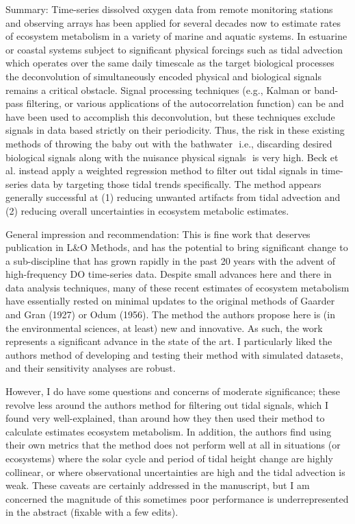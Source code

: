 \documentclass[letterpaper,12pt]{article}\usepackage[]{graphicx}\usepackage[]{color}
\begin{document}
Summary: Time-series dissolved oxygen data from remote monitoring stations and observing arrays has been applied for several decades now to estimate rates of ecosystem metabolism in a variety of marine and aquatic systems. In estuarine or coastal systems subject to significant physical forcings such as tidal advection  which operates over the same daily timescale as the target biological processes  the deconvolution of simultaneously encoded physical and biological signals remains a critical obstacle. Signal processing techniques (e.g., Kalman or
band-pass filtering, or various applications of the autocorrelation function) can be and have been used to accomplish this deconvolution, but these techniques exclude signals in data based strictly on their periodicity. Thus, the risk in these existing methods of throwing the baby out with the bathwater  i.e., discarding desired biological signals along with the nuisance physical signals  is very high. Beck et al. instead apply a weighted regression method to filter out tidal signals in time-series data by targeting those tidal trends specifically. The method appears generally successful at (1) reducing unwanted artifacts from tidal advection and (2) reducing overall uncertainties in ecosystem metabolic estimates.

General impression and recommendation: This is fine work that deserves publication in L\&O Methods, and has the potential to bring significant change to a sub-discipline that has grown rapidly in the past 20 years with the advent of high-frequency DO time-series data. Despite small advances here and there in data analysis techniques, many of these recent estimates of ecosystem metabolism have essentially rested on minimal updates to the original methods of Gaarder and Gran (1927) or Odum (1956). The method the authors propose here is (in the environmental sciences, at least) new and innovative. As such, the work represents a significant advance in the state of the art. I particularly liked the authors method of developing and testing their method with simulated datasets, and their sensitivity analyses are robust.

However, I do have some questions and concerns of moderate significance; these revolve less around the authors method for filtering out tidal signals, which I found very well-explained, than around how they then used their method to calculate estimates ecosystem metabolism. In addition, the authors find using their own metrics that the method does not perform well at all in situations (or ecosystems) where the solar cycle and period of tidal height change are highly collinear, or where observational uncertainties are high and the tidal advection is weak. These caveats are certainly addressed in the manuscript, but I am concerned the magnitude of this sometimes poor performance is underrepresented in the abstract (fixable with a few edits).
\end{document}
